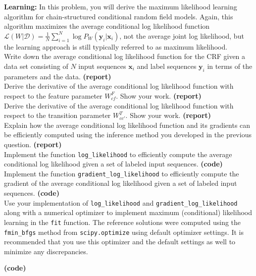 \documentclass[11pt]{article}
\newcommand{\mbf}[1]{{\mathbf{#1}}}
\begin{document}
\vspace{0.25in}
\begin{problem}{30} \textbf{Learning:} In this problem, you will derive the maximum likelihood learning algorithm for chain-structured conditional random field models.
Again, this algorithm maximizes the average conditional log likelihood function $\mathcal{L}(W|\mathcal{D}) = \frac{1}{N}\sum_{i=1}^N\log P_W(\mbf{y}_i|\mbf{x}_i)$,
not the average joint log likelihood, but the learning approach is still typically referred to as maximum likelihood.\\

 Write down the average conditional log likelihood function for the CRF given a data set consisting of $N$ input sequences $\mbf{x}_i$ and label sequences $\mbf{y}_i$ in terms of the parameters and the data. \textbf{(report)}\\

 Derive the derivative of the average conditional log likelihood function with respect to the feature parameter $W^F_{cf}$. Show your work. \textbf{(report)}\\

 Derive the derivative of the average conditional log likelihood function with respect to the transition parameter $W^T_{cc'}$. Show your work. \textbf{(report)}\\

 Explain how the average conditional log likelihood function and its gradients can be efficiently computed using the inference method you developed in the previous question. \textbf{(report)}\\

 Implement the function \verb|log_likelihood| to efficiently compute the average conditional log likelihood given a set of labeled input sequences. \textbf{(code)}\\

 Implement the function \verb|gradient_log_likelihood| to efficiently compute the gradient of the average conditional log likelihood given a set of labeled input sequences. \textbf{(code)}\\

 Use your implementation of \verb|log_likelihood| and \verb|gradient_log_likelihood| along with a numerical optimizer
to implement maximum (conditional) likelihood learning in the \verb|fit| function. The reference solutions were computed using the
\verb|fmin_bfgs| method from \verb|scipy.optimize| using default optimizer settings. It is recommended that you use this optimizer
and the default settings as well to minimize any discrepancies.

\textbf{(code)}
\end{problem}
\end{document}
